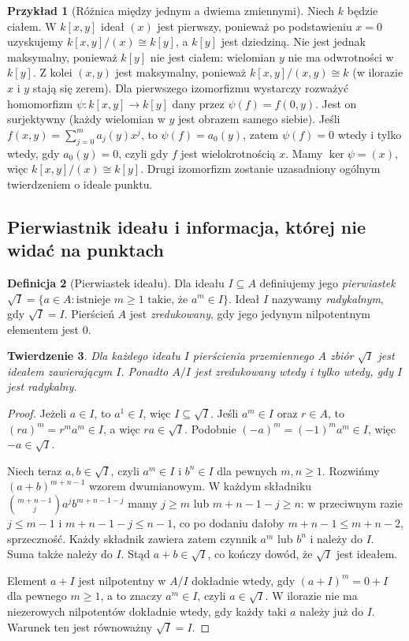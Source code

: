 \documentclass[11pt,a4paper,openany]{report}
\numberwithin{equation}{section}
\theoremstyle{plain}
\newtheorem{twierdzenie}{Twierdzenie}[section]
\theoremstyle{definition}
\newtheorem{definicja}[twierdzenie]{Definicja}
\newtheorem{przyklad}[twierdzenie]{Przykład}
\theoremstyle{remark}
\newcommand{\kerf}{\operatorname{ker}}
\begin{document}
\begin{przyklad}[Różnica między jednym a dwiema zmiennymi]
Niech $k$ będzie ciałem. W $k[x,y]$ ideał $(x)$ jest pierwszy,
ponieważ po podstawieniu $x=0$ uzyskujemy
$k[x,y]/(x)\cong k[y]$, a $k[y]$ jest dziedziną.
Nie jest jednak maksymalny, ponieważ $k[y]$ nie jest ciałem:
wielomian $y$ nie ma odwrotności w $k[y]$.
Z kolei $(x,y)$ jest maksymalny, ponieważ
$k[x,y]/(x,y)\cong k$ (w ilorazie $x$ i $y$ stają się zerem).
Dla pierwszego izomorfizmu wystarczy rozważyć homomorfizm
$\psi\colon k[x,y]\to k[y]$ dany przez $\psi(f)=f(0,y)$.
Jest on surjektywny (każdy wielomian w $y$ jest obrazem samego siebie).
Jeśli $f(x,y)=\sum_{j=0}^m a_j(y)x^j$, to $\psi(f)=a_0(y)$,
zatem $\psi(f)=0$ wtedy i tylko wtedy, gdy $a_0(y)=0$,
czyli gdy $f$ jest wielokrotnością $x$. Mamy $\kerf\psi=(x)$,
więc $k[x,y]/(x)\cong k[y]$. Drugi izomorfizm zostanie
uzasadniony ogólnym twierdzeniem o ideale punktu.
\end{przyklad}

\subsection{Pierwiastnik ideału i informacja, której nie widać na punktach}

\begin{definicja}[Pierwiastek ideału]
Dla ideału $I\subseteq A$ definiujemy jego \emph{pierwiastek}
$\sqrt I=\{a\in A:\text{istnieje }m\ge1\text{ takie, że }a^m\in I\}$.
Ideał $I$ nazywamy \emph{radykalnym}, gdy $\sqrt I=I$.
Pierścień $A$ jest \emph{zredukowany}, gdy jego jedynym
nilpotentnym elementem jest $0$.
\end{definicja}

\begin{twierdzenie}
\label{tw:pierwiastek}
Dla każdego ideału $I$ pierścienia przemiennego $A$
zbiór $\sqrt I$ jest ideałem zawierającym $I$.
Ponadto $A/I$ jest zredukowany wtedy i tylko wtedy, gdy $I$ jest radykalny.
\end{twierdzenie}
\begin{proof}
Jeżeli $a\in I$, to $a^1\in I$, więc $I\subseteq\sqrt I$.
Jeśli $a^m\in I$ oraz $r\in A$, to $(ra)^m=r^ma^m\in I$,
a więc $ra\in\sqrt I$. Podobnie $(-a)^m=(-1)^ma^m\in I$,
więc $-a\in\sqrt I$.

Niech teraz $a,b\in\sqrt I$, czyli $a^m\in I$ i $b^n\in I$
dla pewnych $m,n\ge1$. Rozwińmy $(a+b)^{m+n-1}$
wzorem dwumianowym. W każdym składniku
$\binom{m+n-1}{j}a^jb^{m+n-1-j}$
mamy $j\ge m$ lub $m+n-1-j\ge n$:
w przeciwnym razie $j\le m-1$ i $m+n-1-j\le n-1$,
co po dodaniu dałoby $m+n-1\le m+n-2$, sprzeczność.
Każdy składnik zawiera zatem czynnik $a^m$ lub $b^n$
i należy do $I$. Suma także należy do $I$.
Stąd $a+b\in\sqrt I$, co kończy dowód, że $\sqrt I$ jest ideałem.

Element $a+I$ jest nilpotentny w $A/I$ dokładnie wtedy, gdy
$(a+I)^m=0+I$ dla pewnego $m\ge1$, a to znaczy $a^m\in I$,
czyli $a\in\sqrt I$. W ilorazie nie ma niezerowych nilpotentów
dokładnie wtedy, gdy każdy taki $a$ należy już do $I$.
Warunek ten jest równoważny $\sqrt I=I$.
\end{proof}
\end{document}
